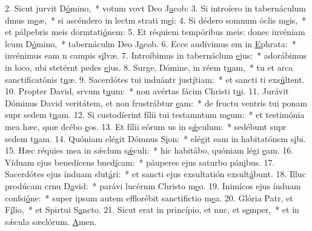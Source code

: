 2. Sicut jurvit D\uline{ó}mino,~* votum vovt Deo J\uline{a}cob:
3. Si introíero in tabernáculum dmus m\uline{e}æ,~* si ascéndero in lectm strati m\uline{e}i:
4. Si dédero somnum óclis m\uline{e}is,~* et pálpebris meis dormtati\uline{ó}nem:
5. Et réquiem tempóribus meis: donec invéniam lcum D\uline{ó}mino,~* tabernáculm Deo J\uline{a}cob.
6. Ecce audívimus em in \uline{E}phrata:~* invénimus eam n campis s\uline{i}lvæ.
7. Introíbimus in tabernáclum \uline{e}jus:~* adorábimus in loco, ubi stetérnt pedes \uline{e}jus.
8. Surge, Dómine, in réem t\uline{u}am,~* tu et arca sanctificatónis t\uline{u}æ.
9. Sacerdótes tui induántr just\uline{í}tiam:~* et sancti ti exs\uline{ú}ltent.
10. Propter David, srvum t\uline{u}um:~* non avértas fácim Christi t\uline{u}i.
11. Jurávit Dóminus David veritátem, et non frustrábtur \uline{e}am:~* de fructu ventris tui ponam supr sedem t\uline{u}am.
12. Si custodíerint fílii tui testamntum m\uline{e}um:~* et testimónia mea hæc, quæ dcébo \uline{e}os.
13. Et fílii eórum us in s\uline{ǽ}culum:~* sedébunt supr sedem t\uline{u}am.
14. Quóniam elégit Dómnus S\uline{i}on:~* elégit eam in habitatónem s\uline{i}bi.
15. Hæc réquies mea in sǽclum s\uline{ǽ}culi:~* hic habitábo, quóniam légi \uline{e}am.
16. Víduam ejus benedícens bned\uline{í}cam:~* páuperes ejus saturbo pán\uline{i}bus.
17. Sacerdótes ejus índuam slut\uline{á}ri:~* et sancti ejus exsultatión exsult\uline{á}bunt.
18. Illuc prodúcam crnu D\uline{a}vid:~* parávi lucérnm Christo m\uline{e}o.
19. Inimícos ejus índuam confsi\uline{ó}ne:~* super ipsum autem efflorébit sanctifictio m\uline{e}a.
20. Glória Patr, et F\uline{í}lio,~* et Spirtui S\uline{a}ncto.
21. Sicut erat in princípio, et nnc, et s\uline{e}mper,~* et in sǽcula sæclórum. \uline{A}men.
